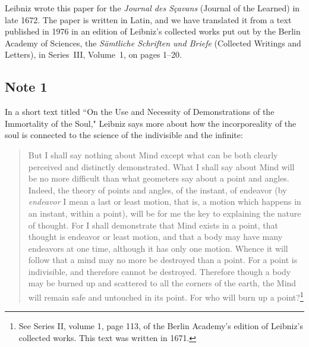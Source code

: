 \documentclass[twoside,openright]{article}
\begin{document}
Leibniz wrote this paper for the {\em Journal des S\c{c}avans} (Journal of the Learned) in late 1672.   The paper is written in Latin, and we have translated it from a text published in 1976 in an edition of Leibniz's collected works put out by the Berlin Academy of Sciences, the  {\em S\"{a}mtliche Schriften und Briefe} (Collected Writings and Letters), in Series~III, Volume~1, on pages 1--20. 

\subsection*{Note 1}
\label{caa1}

In a short text titled ``On the Use and Necessity of Demonstrations of the Immortality of the Soul," Leibniz says more about how the incorporeality of the soul is connected to the science of the indivisible and the infinite:
\begin{quote}
But I shall say nothing about Mind except what can be both clearly perceived and distinctly demonstrated.  What I shall say about Mind will be no more difficult than what geometers say about a point and angles.  Indeed, the theory of points and angles, of the instant, of endeavor (by {\em endeavor} I mean a last or least motion, that is, a motion which happens in an instant, within a point), will be for me the key to explaining the nature of thought.  For I shall demonstrate that Mind exists in a point, that thought is endeavor or least motion, and that a body may have many endeavors at one time, although it has only one motion.  Whence it will follow that a mind may no more be destroyed than a point.  For a point is indivisible, and therefore cannot be destroyed.  Therefore though a body may be burned up and scattered to all the corners of the earth, the Mind will remain safe and untouched in its point.  For who will burn up a point?\footnote{See Series II, volume 1, page 113, of the Berlin Academy's edition of Leibniz's collected works. This text was written in 1671.} 
\end{quote}
\end{document}
